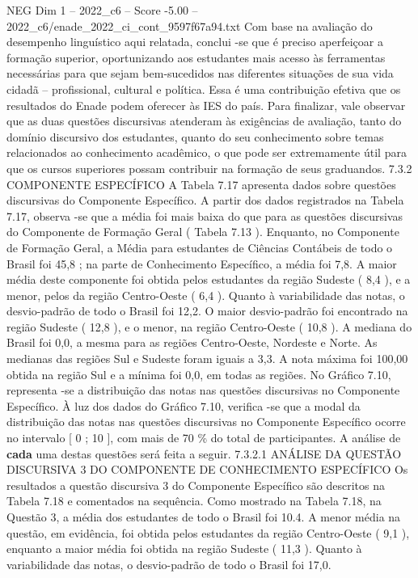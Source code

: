 \begin{textsample}{NEG Dim 1 – 2022\_c6 – Score -5.00 – 2022\_c6/enade\_2022\_ci\_cont\_9597f67a94.txt}
Com base na avaliação do desempenho linguístico aqui relatada, conclui -se que é preciso aperfeiçoar a formação superior, oportunizando aos estudantes mais acesso às ferramentas necessárias para que sejam bem-sucedidos nas diferentes situações de sua vida cidadã – profissional, cultural e política.
Essa é uma contribuição efetiva que os resultados do Enade podem oferecer às IES do país.
Para finalizar, vale observar que as duas questões discursivas atenderam às exigências de avaliação, tanto do domínio discursivo dos estudantes, quanto do seu conhecimento sobre temas relacionados ao conhecimento acadêmico, o que pode ser extremamente útil para que os cursos superiores possam contribuir na formação de seus graduandos. 7.3.2 COMPONENTE ESPECÍFICO A Tabela 7.17 apresenta dados sobre questões discursivas do Componente Específico.
A partir dos dados registrados na Tabela 7.17, observa -se que a média foi mais baixa do que para as questões discursivas do Componente de Formação Geral ( Tabela 7.13 ).
Enquanto, no Componente de Formação Geral, a Média para estudantes de Ciências Contábeis de todo o Brasil foi 45,8 ; na parte de Conhecimento Específico, a média foi 7,8.
A maior média deste componente foi obtida pelos estudantes da região Sudeste ( 8,4 ), e a menor, pelos da região Centro-Oeste ( 6,4 ).
Quanto à variabilidade das notas, o desvio-padrão de todo o Brasil foi 12,2.
O maior desvio-padrão foi encontrado na região Sudeste ( 12,8 ), e o menor, na região Centro-Oeste ( 10,8 ).
A mediana do Brasil foi 0,0, a mesma para as regiões Centro-Oeste, Nordeste e Norte.
As medianas das regiões Sul e Sudeste foram iguais a 3,3.
A nota máxima foi 100,00 obtida na região Sul e a mínima foi 0,0, em todas as regiões.
No Gráfico 7.10, representa -se a distribuição das notas nas questões discursivas no Componente Específico.
À luz dos dados do Gráfico 7.10, verifica -se que a modal da distribuição das notas nas questões discursivas no Componente Específico ocorre no intervalo [ 0 ; 10 ], com mais de 70 \% do total de participantes.
A análise de \textbf{cada} uma destas questões será feita a seguir. 7.3.2.1 ANÁLISE DA QUESTÃO DISCURSIVA 3 DO COMPONENTE DE CONHECIMENTO ESPECÍFICO Os resultados a questão discursiva 3 do Componente Específico são descritos na Tabela 7.18 e comentados na sequência.
Como mostrado na Tabela 7.18, na Questão 3, a média dos estudantes de todo o Brasil foi 10.4.
A menor média na questão, em evidência, foi obtida pelos estudantes da região Centro-Oeste ( 9,1 ), enquanto a maior média foi obtida na região Sudeste ( 11,3 ).
Quanto à variabilidade das notas, o desvio-padrão de todo o Brasil foi 17,0.

\end{textsample}
